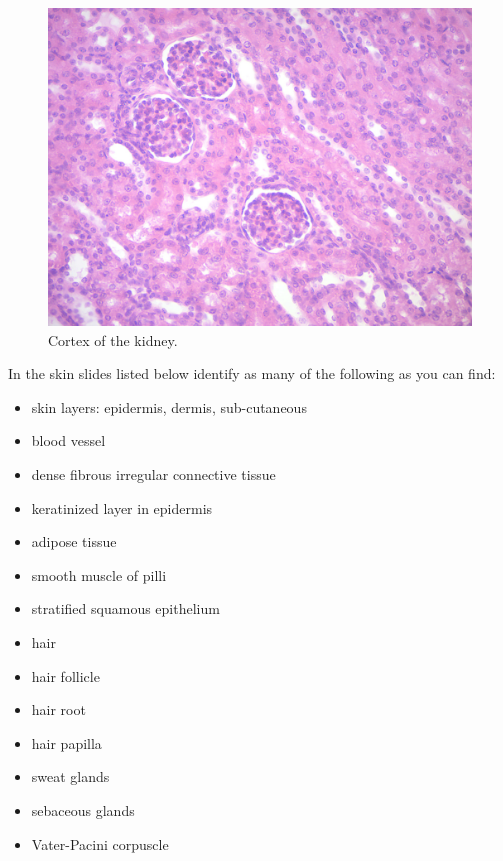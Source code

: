\begin{figure}

{\centering \includegraphics[width=0.7\linewidth]{./figures/anatomy/kidney}

}

\caption{Cortex of the kidney.}\label{fig:kidney}
\end{figure}

In the skin slides listed below identify as many of the following as you
can find:

\begin{itemize}
\tightlist
\item
  skin layers: epidermis, dermis, sub-cutaneous
\item
  blood vessel
\item
  dense fibrous irregular connective tissue
\item
  keratinized layer in epidermis
\item
  adipose tissue
\item
  smooth muscle of pilli
\item
  stratified squamous epithelium
\item
  hair
\item
  hair follicle
\item
  hair root
\item
  hair papilla
\item
  sweat glands
\item
  sebaceous glands
\item
  Vater-Pacini corpuscle
\end{itemize}

